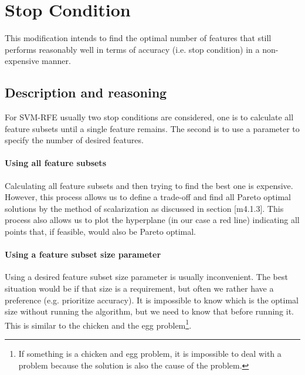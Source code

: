 \newcommand{\VS}{\vspace{6pt}}
\newcommand{\vt}[1]{\vec{#1}}

\chapter{Stop Condition} %

\label{Chapter1} %


This modification intends to find the optimal number of features that still performs reasonably well in terms of accuracy (i.e. stop condition) in a non-expensive manner. 

\section{Description and reasoning}
\label{sec:stopCond.desc}

For SVM-RFE usually two stop conditions are considered, one is to calculate all feature subsets until a single feature remains. The second is to use a parameter to specify the number of desired features.

\subsubsection*{Using all feature subsets}

Calculating all feature subsets and then trying to find the best one is expensive. However, this process allows us to define a trade-off and find all Pareto optimal solutions by the method of scalarization as discussed in section [m4.1.3]. This pro\-cess also allows us to plot the hyperplane (in our case a red line) indicating all points that, if feasible, would also be Pareto optimal.

\subsubsection*{Using a feature subset size parameter}

Using a desired feature subset size parameter is usually inconvenient. The best situation would be if that size is a re\-quire\-ment, but often we rather have a preference (e.g. prioritize accuracy). It is impossible to know which is the optimal size without running the algorithm, but we need to know that before running it. This is similar to the chicken and the egg problem\footnote{If something is a chicken and egg problem, it is impossible to deal with a problem because the solution is also the cause of the problem.}.

